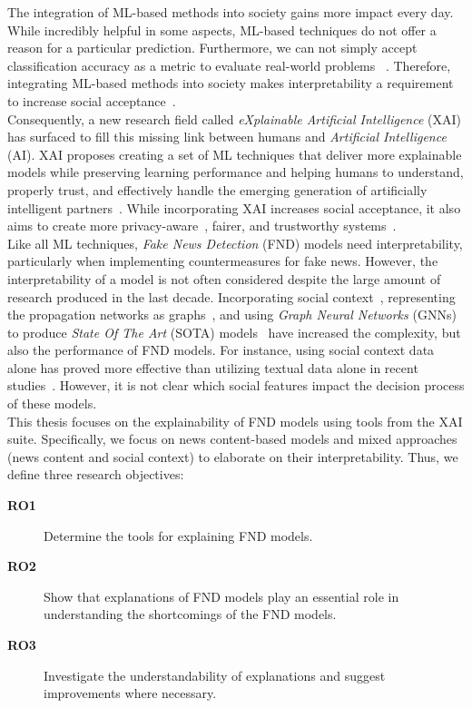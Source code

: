 The integration of ML-based methods into society gains more impact every day. While incredibly helpful in some aspects, ML-based techniques do not offer a reason for a particular prediction. Furthermore, we can not simply accept classification accuracy as a metric to evaluate real-world problems ~\parencite{TowardsARigorousScienceML_Velez}. Therefore, integrating ML-based methods into society makes interpretability a requirement to increase social acceptance~\parencite{InterpretableMachineLearning_Molnar}.\\
Consequently, a new research field called \emph{eXplainable Artificial Intelligence} (XAI) has surfaced to fill this missing link between humans and \emph{Artificial Intelligence} (AI). XAI proposes creating a set of ML techniques that deliver more explainable models while preserving learning performance and helping humans to understand, properly trust, and effectively handle the emerging generation of artificially intelligent partners~\parencite{XAI_Gunning}. While incorporating XAI increases social acceptance, it also aims to create more privacy-aware~\parencite{SlaveToTheAlgorithm_EdwardsVeale}, fairer, and trustworthy systems~\parencite{TheMythosOfModelInterpretability_Lipton}.\\
Like all ML techniques, \emph{Fake News Detection} (FND) models need interpretability, particularly when implementing countermeasures for fake news. However, the interpretability of a model is not often considered despite the large amount of research produced in the last decade. Incorporating social context~\parencite{FakeNewsNet_Shu}, representing the propagation networks as graphs~\parencite{UPFD_Dataset_Shu}, and using \emph{Graph Neural Networks} (GNNs) to produce \emph{State Of The Art} (SOTA) models~\parencite{FakeNewsDetectionUsingGeometricDeepLearning_Monti} have increased the complexity, but also the performance of FND models. For instance, using social context data alone has proved more effective than utilizing textual data alone in recent studies~\parencite{UPFD_Dataset_Shu}. However, it is not clear which social features impact the decision process of these models.\\
This thesis focuses on the explainability of FND models using tools from the XAI suite. Specifically, we focus on news content-based models and mixed approaches (news content and social context) to elaborate on their interpretability. Thus, we define three research objectives:
\begin{description}
    \item[\textbf{RO1}] Determine the tools for explaining FND models.
    \item[\textbf{RO2}] Show that explanations of FND models play an essential role in understanding the shortcomings of the FND models.
    \item[\textbf{RO3}] Investigate the understandability of explanations and suggest improvements where necessary.
\end{description}
